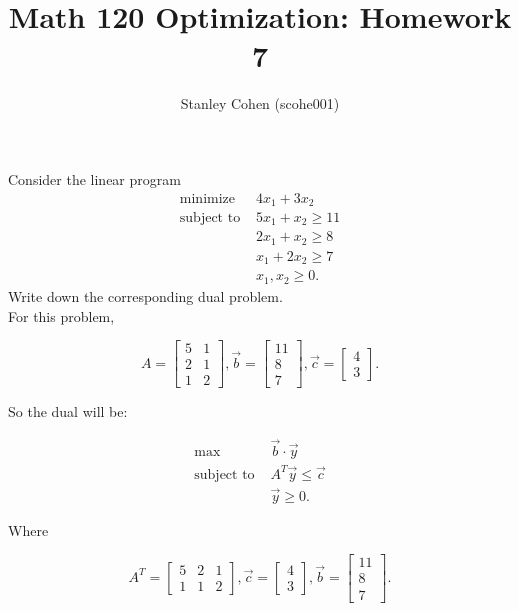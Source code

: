 \documentclass[12pt]{extarticle}
\title{Math 120 Optimization: Homework 7}
\author{Stanley Cohen (scohe001)}
\date{}
\theoremstyle{definition}
\begin{document}
\maketitle


\begin{problem} Consider the linear program
	 \begin{align*}
	\text{minimize } &4x_1+3x_2\\
	\text{subject to } & 5x_1+x_2\geq 11\\
	&2x_1+x_2\geq 8\\
	&x_1+2x_2\geq 7\\
	&x_1,x_2\geq 0.
	\end{align*}
	Write down the corresponding dual problem.\\

	For this problem, 

		$$A=\begin{bmatrix}
		5&1\\2&1\\1&2
		\end{bmatrix},\vec{b}=\begin{bmatrix}
		11\\8\\7
		\end{bmatrix},\vec{c}=\begin{bmatrix}
		4\\3
		\end{bmatrix}.$$

	So the dual will be:

		\begin{align*}
		\text{max } &\vec{b} \cdot \vec{y}\\
		\text{subject to } & A^T \vec{y} \leq \vec{c}\\
		&\vec{y}\geq 0.
		\end{align*}

	Where

		$$A^T=\begin{bmatrix}
		5&2&1\\1&1&2
		\end{bmatrix},\vec{c}=\begin{bmatrix}
		4\\3
		\end{bmatrix},\vec{b}=\begin{bmatrix}
		11\\8\\7
		\end{bmatrix}.$$

\end{problem}
\end{document}
